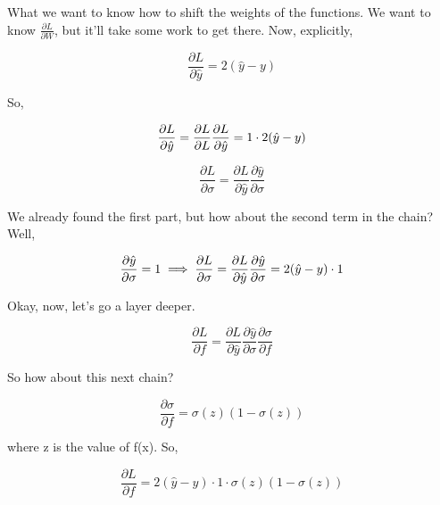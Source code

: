 What we want to know how to shift the weights of the functions. We want to know $\frac{\partial L}{\partial W}$, but it'll take some work to get there. Now, explicitly,

\begin{equation}
\frac{\partial L}{\partial \hat{y}} = 2(\hat{y} - y )
\end{equation}

So,

\begin{equation}
\frac{\partial L}{\partial \hat{y}} = \frac{\partial L}{\partial L}\frac{\partial L}{\partial \hat{y}} \\
= 1 \cdot 2(\hat{y} - y )
\end{equation}

\begin{equation}
\frac{\partial L}{\partial \sigma} = \frac{\partial L}{\partial \hat{y}} \frac{\partial \hat{y}}{\partial \sigma}
\end{equation}

We already found the first part, but how about the second term in the chain? Well,

\begin{equation}
    \frac{\partial \hat{y}}{\partial \sigma} = 1 \\
    \implies \frac{\partial L}{\partial \sigma} =  \frac    {\partial L}{\partial \hat{y}} \frac{\partial \hat{y}}  {\partial \sigma} \\
    = 2(\hat{y} - y ) \cdot 1
\end{equation}

Okay, now, let's go a layer deeper.

\begin{equation}
\frac{\partial L}{\partial f} = \frac{\partial L}{\partial \hat{y}} \frac{\partial \hat{y}}{\partial \sigma} \frac{\partial \sigma}{\partial f}
\end{equation}

So how about this next chain?

\begin{equation}
\frac{\partial \sigma}{\partial f} = \sigma(z)(1 - \sigma(z))
\end{equation}

where z is the value of f(x). So,

\begin{equation}
\frac{\partial L}{\partial f} = 2(\hat{y} - y ) \cdot 1 \cdot  \sigma(z)(1 - \sigma(z))
\end{equation}

